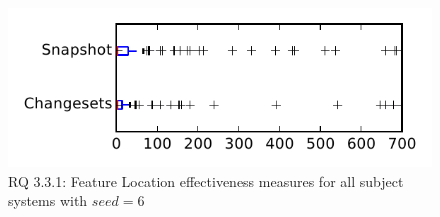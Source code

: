 
\begin{figure}
\centering
\includegraphics[height=0.4\textheight]{figures/flt_seed/rq1_tiny_6}
\caption{RQ 3.3.1: Feature Location effectiveness measures for all subject systems with $seed=6$}
\label{fig:flt_seed:rq1:tiny}
\end{figure}
